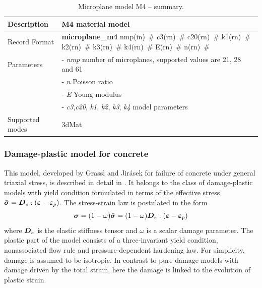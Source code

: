 \documentclass[a4paper]{article}
\newcommand{\mbf}[1]{\mbox{\boldmath$#1$}}
\newcommand{\descitem}[1]{{\noindent \bf #1}}
\newcommand{\elemparam}[2]{{{#1\tiny (#2)}~\#}}
\newcommand{\param}[1]{{\it #1}}
\newcommand{\veps}{\mbf{\varepsilon}}  %
\newcommand{\vsig}{\mbf{\sigma}}%
\begin{document}
\begin{table}[!htb]
\begin{tabular}{|l|p{9cm}|}
\hline
Description & M4 material model\\
\hline
Record Format & \descitem{microplane\_m4}  \elemparam{nmp}{in}
\elemparam{c3}{rn} \elemparam{c20}{rn} \elemparam{k1}{rn}
\elemparam{k2}{rn} \elemparam{k3}{rn} \elemparam{k4}{rn}
\elemparam{E}{rn} \elemparam{n}{rn} \\
Parameters &- \param{nmp} number of microplanes, supported values are
21, 28 and 61\\
&- \param{n} Poisson ratio\\
&- \param{E} Young modulus \\
&- \param{c3},\param{c20}, \param{k1}, \param{k2}, \param{k3},
\param{k4}  model parameters\\
Supported modes& 3dMat\\
\hline
\end{tabular}
\caption{Microplane model M4 -- summary.}
\label{m4_table}
\end{table}

\newcommand{\beq}{\begin{equation}}
\newcommand{\eeq}{\end{equation}}
\newcommand{\fc}{\bar{f}_c}
\newcommand{\ft}{\bar{f}_t}
\newcommand{\mD}{\mbf{D}}
\newcommand{\qh}{q_{\rm h}}

\subsubsection{Damage-plastic model for concrete}

This model, developed by Grassl and Jir\'{a}sek for failure of concrete
under general triaxial stress, is described in detail in \cite{GraJir}.
It belongs to the class of damage-plastic models with yield condition formulated
in terms of the effective stress $\bar{\vsig}=\mD_e:(\veps-\veps_p)$.
The stress-strain law is postulated in the form 
\beq
\vsig = (1-\omega)\bar{\vsig}=(1-\omega)\mD_e:(\veps-\veps_p)
\eeq
where $\mD_e$ is the elastic stiffness tensor
and $\omega$ is a scalar damage parameter. 
The plastic part of the model consists of a three-invariant yield condition, nonassociated flow rule and pressure-dependent hardening law. 
For simplicity, damage is assumed to be isotropic.
In contrast to pure damage models with damage driven by the total strain, here the damage is linked to the evolution of plastic strain.
\end{document}
